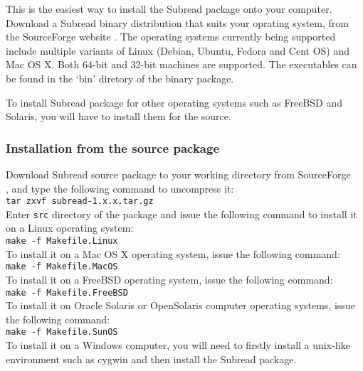 \documentclass[12pt]{report}
\newcommand{\code}[1]{{\small\texttt{#1}}}
\newcommand{\Subread}{\textsf{Subread}}
\begin{document}
This is the easiest way to install the {\Subread} package onto your computer.
Download a {\Subread} binary distribution that suits your oprating system, from the SourceForge website {}. The operating systems currently being supported include multiple variants of Linux (Debian, Ubuntu, Fedora and Cent OS) and Mac OS X. Both 64-bit and 32-bit machines are supported. The executables can be found in the `bin' diretory of the binary package.

To install {\Subread} package for other operating systems such as FreeBSD and Solaris, you will have to install them for the source.


\subsubsection{Installation from the source package}

Download {\Subread} source package to your working directory from SourceForge \\
{}, and type the following command to uncompress it:\\

\code{tar zxvf subread-1.x.x.tar.gz}\\

Enter \code{src} directory of the package and issue the following command to install it on a Linux operating system: \\

\code{make -f Makefile.Linux}\\

To install it on a Mac OS X operating system, issue the following command:\\

\code{make -f Makefile.MacOS}\\

To install it on a FreeBSD operating system, issue the following command:\\

\code{make -f Makefile.FreeBSD}\\

To install it on Oracle Solaris or OpenSolaris computer operating systems, issue the following command:\\

\code{make -f Makefile.SunOS}\\

To install it on a Windows computer, you will need to firstly install a unix-like environment such as cygwin and then install the {\Subread} package.\\
\end{document}

